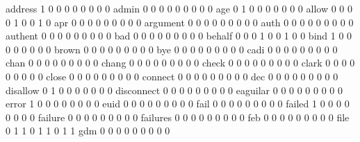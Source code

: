 \documentclass[compress,8pt]{beamer}
\begin{document}
\begin{frame}
\begin{Schunk}
  address                                    1   0   0   0   0   0   0   0   0
  admin                                      0   0   0   0   0   0   0   0   0
  age                                        0   1   0   0   0   0   0   0   0
  allow                                      0   0   0   0   1   0   0   1   0
  apr                                        0   0   0   0   0   0   0   0   0
  argument                                   0   0   0   0   0   0   0   0   0
  auth                                       0   0   0   0   0   0   0   0   0
  authent                                    0   0   0   0   0   0   0   0   0
  bad                                        0   0   0   0   0   0   0   0   0
  behalf                                     0   0   0   1   0   0   1   0   0
  bind                                       1   0   0   0   0   0   0   0   0
  brown                                      0   0   0   0   0   0   0   0   0
  bye                                        0   0   0   0   0   0   0   0   0
  cadi                                       0   0   0   0   0   0   0   0   0
  chan                                       0   0   0   0   0   0   0   0   0
  chang                                      0   0   0   0   0   0   0   0   0
  check                                      0   0   0   0   0   0   0   0   0
  clark                                      0   0   0   0   0   0   0   0   0
  close                                      0   0   0   0   0   0   0   0   0
  connect                                    0   0   0   0   0   0   0   0   0
  dec                                        0   0   0   0   0   0   0   0   0
  disallow                                   0   1   0   0   0   0   0   0   0
  disconnect                                 0   0   0   0   0   0   0   0   0
  eaguilar                                   0   0   0   0   0   0   0   0   0
  error                                      1   0   0   0   0   0   0   0   0
  euid                                       0   0   0   0   0   0   0   0   0
  fail                                       0   0   0   0   0   0   0   0   0
  failed                                     1   0   0   0   0   0   0   0   0
  failure                                    0   0   0   0   0   0   0   0   0
  failures                                   0   0   0   0   0   0   0   0   0
  feb                                        0   0   0   0   0   0   0   0   0
  file                                       0   1   1   0   1   1   0   1   1
  gdm                                        0   0   0   0   0   0   0   0   0

\end{Schunk}
\end{frame}
\end{document}
